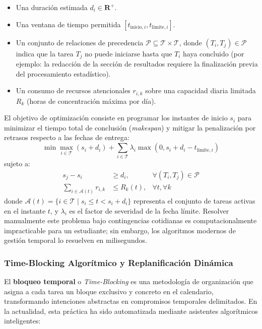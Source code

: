 \begin{itemize}
    \item Una duración estimada $d_i \in \mathbf{R}^+$.
    \item Una ventana de tiempo permitida $[t_{\mathrm{inicio}, i}, t_{\mathrm{limite}, i}]$.
    \item Un conjunto de relaciones de precedencia $\mathcal{P} \subseteq \mathcal{T} \times \mathcal{T}$, donde $(T_i, T_j) \in \mathcal{P}$ indica que la tarea $T_j$ no puede iniciarse hasta que $T_i$ haya concluido (por ejemplo: la redacción de la sección de resultados requiere la finalización previa del procesamiento estadístico).
    \item Un consumo de recursos atencionales $r_{i,k}$ sobre una capacidad diaria limitada $R_k$ (horas de concentración máxima por día).
\end{itemize}

El objetivo de optimización consiste en programar los instantes de inicio $s_i$ para minimizar el tiempo total de conclusión (\textit{makespan}) y mitigar la penalización por retrasos respecto a las fechas de entrega:
\begin{equation}
    \min \max_{i \in \mathcal{T}} (s_i + d_i) + \sum_{i \in \mathcal{T}} \lambda_i \max(0, s_i + d_i - t_{\mathrm{limite}, i})
\end{equation}
sujeto a:
\begin{equation}
\begin{array}{rll}
    s_j - s_i &\ge d_i, & \forall (T_i, T_j) \in \mathcal{P} \\[0.2cm]
    \displaystyle \sum_{i \in \mathcal{A}(t)} r_{i,k} &\le R_k(t), & \forall t, \forall k
\end{array}
\end{equation}
donde $\mathcal{A}(t) = \{i \in \mathcal{T} \mid s_i \le t < s_i + d_i\}$ representa el conjunto de tareas activas en el instante $t$, y $\lambda_i$ es el factor de severidad de la fecha límite. Resolver manualmente este problema bajo contingencias cotidianas es computacionalmente impracticable para un estudiante; sin embargo, los algoritmos modernos de gestión temporal lo resuelven en milisegundos.

\subsubsection{Time-Blocking Algorítmico y Replanificación Dinámica}

El \textbf{bloqueo temporal} o \textit{Time-Blocking} es una metodología de organización que asigna a cada tarea un bloque exclusivo y concreto en el calendario, transformando intenciones abstractas en compromisos temporales delimitados. En la actualidad, esta práctica ha sido automatizada mediante asistentes algorítmicos inteligentes:

